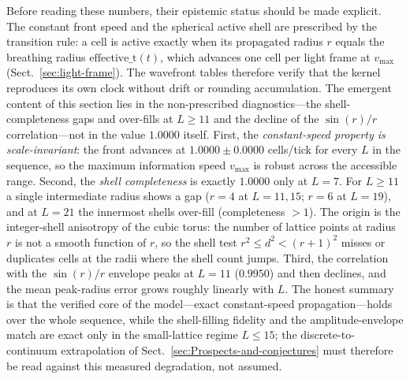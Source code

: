 \documentclass{ijuc}
\begin{document}
Before reading these numbers, their epistemic status should be made explicit.  The constant front speed and the spherical active shell are prescribed by the transition rule: a cell is active exactly when its propagated radius $r$ equals the breathing radius $\mathrm{effective\_t}(t)$, which advances one cell per light frame at $v_{\max}$ (Sect.~\ref{sec:light-frame}).  The wavefront tables therefore verify that the kernel reproduces its own clock without drift or rounding accumulation.  The emergent content of this section lies in the non-prescribed diagnostics---the shell-completeness gaps and over-fills at $L\ge11$ and the decline of the $\sin(r)/r$ correlation---not in the value $1.0000$ itself.
First, the \emph{constant-speed property is scale-invariant}: the front advances at $1.0000\pm0.0000$ cells/tick for every $L$ in the sequence, so the maximum information speed $v_{\max}$ is robust across the accessible range.
Second, the \emph{shell completeness} is exactly $1.0000$ only at $L=7$.  For $L\ge11$ a single intermediate radius shows a gap ($r=4$ at $L=11,15$; $r=6$ at $L=19$), and at $L=21$ the innermost shells over-fill (completeness $>1$).  The origin is the integer-shell anisotropy of the cubic torus: the number of lattice points at radius $r$ is not a smooth function of $r$, so the shell test $r^{2}\le d^{2}<(r+1)^{2}$ misses or duplicates cells at the radii where the shell count jumps.
Third, the correlation with the $\sin(r)/r$ envelope peaks at $L=11$ ($0.9950$) and then declines, and the mean peak-radius error grows roughly linearly with $L$.
The honest summary is that the verified core of the model---exact constant-speed propagation---holds over the whole sequence, while the shell-filling fidelity and the amplitude-envelope match are exact only in the small-lattice regime $L\le15$; the discrete-to-continuum extrapolation of Sect.~\ref{sec:Prospects-and-conjectures} must therefore be read against this measured degradation, not assumed.
\end{document}
